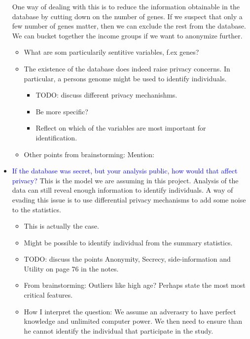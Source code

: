 \begin{itemize}
    One way of dealing with this is to reduce the information obtainable in the database by cutting down on the number of genes. If we suspect that only a few number of genes matter, then we can exclude the rest from the database. We can bucket together the income groups if we want to anonymize further. 
        \begin{itemize}
            \item What are som particularily sentitive variables, f.ex genes?
            \item The existence of the database does indeed raise privacy concerns. 
            In particular, a persons genome might be used to identify individuals. 
            \begin{itemize}
                \item TODO: discuss different privacy mechanishms. 
                \item Be more specific?
                \item Reflect on which of the variables are most important for identification. 
            \end{itemize}
            \item Other points from brainstorming: Mention: 
        \end{itemize}
    \item \textcolor{blue}{If the database was secret, but your analysis public, how would that affect privacy?}
        This is the model we are assuming in this project. Analysis of the data can still reveal enough information to identify individuals. A way of evading this issue is to use differential privacy mechanisms to add some noise to the statistics.
        \begin{itemize}
            \item This is actually the case. 
            \item Might be possible to identify individual from the summary statistics. 
            \item TODO: discuss the points Anonymity, Secrecy, side-information and Utility on page 76 in the notes. 
            \item From brainstorming: Outliers like high age? Perhaps state the most most critical features. 
            \item How I interpret the question: We assume an adverasry to have perfect knowledge and unlimited computer power. 
            We then need to ensure than he cannot identify the individual that participate in the study. 
        \end{itemize}

\end{itemize}
